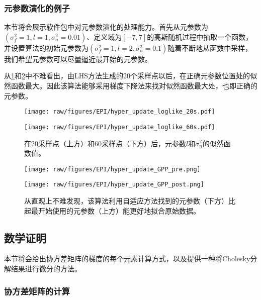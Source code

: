\documentclass[index]{subfiles}
\begin{document}
\subsubsection{元参数演化的例子}

本节将会展示软件包中对元参数演化的处理能力。首先从元参数为$(\sigma_{f}^{2} = 1, l = 1, \sigma_{n}^{2} = 0.01)$、定义域为$[-7,7]$的高斯随机过程中抽取一个函数，并设置算法的初始元参数为$(\sigma_{f}^{2} = 1, l = 2, \sigma_{n}^{2} = 0.1)$随着不断地从函数中采样，我们希望元参数可以尽量逼近最开始的元参数。

从\cref{fig:EPI_hyper_1}和\cref{fig:EPI_hyper_2}中不难看出，由LHS方法生成的20个采样点以后，在正确元参数位置处的似然函数最大。因此该算法能够采用梯度下降法来找对似然函数最大处，也即正确的元参数。

\begin{figure}[hpt]
 	\centerline{\texttt{[image: raw/figures/EPI/hyper\_update\_loglike\_20s.pdf]}}
    \centerline{\texttt{[image: raw/figures/EPI/hyper\_update\_loglike\_60s.pdf]}}
    \caption[元参数的似然函数]{在20采样点（上方）和60采样点（下方）后，元参数$l$和$\sigma_{n}^{2}$的似然函数值。}
 	\label{fig:EPI_hyper_1}
\end{figure}

\begin{figure}[hpt]
 	\centerline{\texttt{[image: raw/figures/EPI/hyper\_update\_GPP\_pre.png]}}
    \centerline{\texttt{[image: raw/figures/EPI/hyper\_update\_GPP\_post.png]}}
    \caption[元参数的演化]{从直观上不难发现，该算法利用自适应方法找到的元参数（下方）比起最开始使用的元参数（上方）能更好地拟合原始数据。}
 	\label{fig:EPI_hyper_2}
\end{figure}


\subsection{数学证明}

本节将会给出协方差矩阵的梯度的每个元素计算方式，以及提供一种将Cholesky分解结果进行微分的方法。

\subsubsection{协方差矩阵的计算}
\label{EPI_imp_var}
\end{document}
